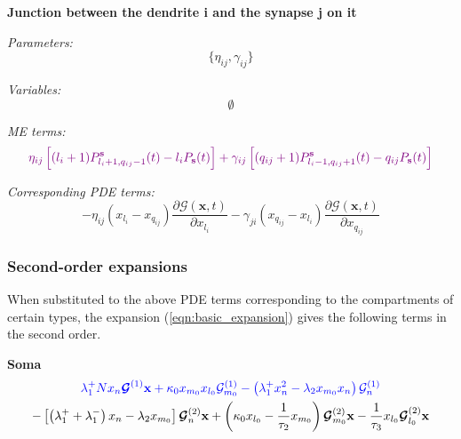 \documentclass[a4paper, 11pt]{article}
\begin{document}
              {\bf Junction between the dendrite i and the synapse j on it}
              
              {\it Parameters:}
              \begin{equation*}
                \{\eta_{ij}, \gamma_{ij}\}
              \end{equation*}

              {\it Variables:}
              \begin{equation*}
                \emptyset
              \end{equation*}

              {\it ME terms:}
              \begin{equation}
                \begin{split}
                  \textcolor{violet}{\eta_{ij}\left[(l_i+1)P_{l_i+1, q_{ij}-1}^{\mathbf s}(t) - l_iP_{\mathbf s}(t)\right] + \gamma_{ij}\left[(q_{ij}+1)P_{l_i-1, q_{ij}+1}^{\mathbf s}(t) - q_{ij}P_{\mathbf s}(t)\right]}
                \end{split}
              \end{equation}
              
              {\it Corresponding PDE terms:}
              \begin{equation}
                -\eta_{ij}(x_{l_i}-x_{q_{ij}})\frac{\partial\mathcal G(\mathbf x, t)}{\partial x_{l_i}} - \gamma_{ji}(x_{q_{ij}}-x_{l_i})\frac{\partial\mathcal G(\mathbf x, t)}{\partial x_{q_{ij}}}
              \end{equation}
              
              \subsubsection{Second-order expansions}
              When substituted to the above PDE terms corresponding to the compartments of certain types, the expansion (\ref{eqn:basic_expansion}) gives the following terms in the second order.
              
              {\bf Soma}
              \begin{multline*}
                \textcolor{blue}{\lambda_1^+Nx_n\boldsymbol{\mathcal G}^{(1)}\mathbf x + \kappa_0x_{m_0}x_{l_0}\mathcal G^{(1)}_{m_0} - \left(\lambda_1^+x_n^2-\lambda_2x_{m_0}x_n\right)\mathcal G_n^{(1)}}\\
                -\left[\left(\lambda_1^++\lambda_1^-\right)x_n-\lambda_2x_{m_0}\right]\boldsymbol{\mathcal G}_n^{(2)}\mathbf x + \left(\kappa_0x_{l_0}-\frac{1}{\tau_2}x_{m_0}\right)\boldsymbol{\mathcal G}_{m_0}^{(2)}\mathbf x - \frac{1}{\tau_3}x_{l_0}\boldsymbol{\mathcal G}^{(2)}_{l_0}\mathbf x
              \end{multline*}
              
\end{document}

